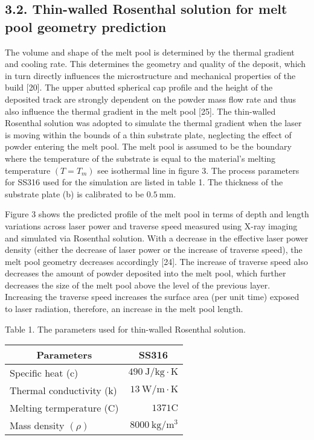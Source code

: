 \documentclass[10pt]{article}
\begin{document}
\subsection*{3.2. Thin-walled Rosenthal solution for melt pool geometry prediction}
The volume and shape of the melt pool is determined by the thermal gradient and cooling rate. This determines the geometry and quality of the deposit, which in turn directly influences the microstructure and mechanical properties of the build [20]. The upper abutted spherical cap profile and the height of the deposited track are strongly dependent on the powder mass flow rate and thus also influence the thermal gradient in the melt pool [25]. The thin-walled Rosenthal solution was adopted to simulate the thermal gradient when the laser is moving within the bounds of a thin substrate plate, neglecting the effect of powder entering the melt pool. The melt pool is assumed to be the boundary where the temperature of the substrate is equal to the material's melting temperature $\left(T=T_{m}\right)$ see isothermal line in figure 3. The process parameters for SS316 used for the simulation are listed in table 1. The thickness of the substrate plate (b) is calibrated to be $0.5 \mathrm{~mm}$.

Figure 3 shows the predicted profile of the melt pool in terms of depth and length variations across laser power and traverse speed measured using X-ray imaging and simulated via Rosenthal solution. With a decrease in the effective laser power density (either the decrease of laser power or the increase of traverse speed), the melt pool geometry decreases accordingly [24]. The increase of traverse speed also decreases the amount of powder deposited into the melt pool, which further decreases the size of the melt pool above the level of the previous layer. Increasing the traverse speed increases the surface area (per unit time) exposed to laser radiation, therefore, an increase in the melt pool length.

Table 1. The parameters used for thin-walled Rosenthal solution.

\begin{center}
\begin{tabular}{|l|r|}
\hline
\multicolumn{1}{|c|}{Parameters} & \multicolumn{1}{|c|}{SS316} \\
\hline
Specific heat (c) & $490 \mathrm{~J} / \mathrm{kg} \cdot \mathrm{K}$ \\
Thermal conductivity (k) & $13 \mathrm{~W} / \mathrm{m} \cdot \mathrm{K}$ \\
Melting termperature (C) & $1371 \mathrm{C}$ \\
Mass density $(\rho)$ & $8000 \mathrm{~kg} / \mathrm{m}^{3}$ \\
\hline
\end{tabular}
\end{center}
\end{document}
